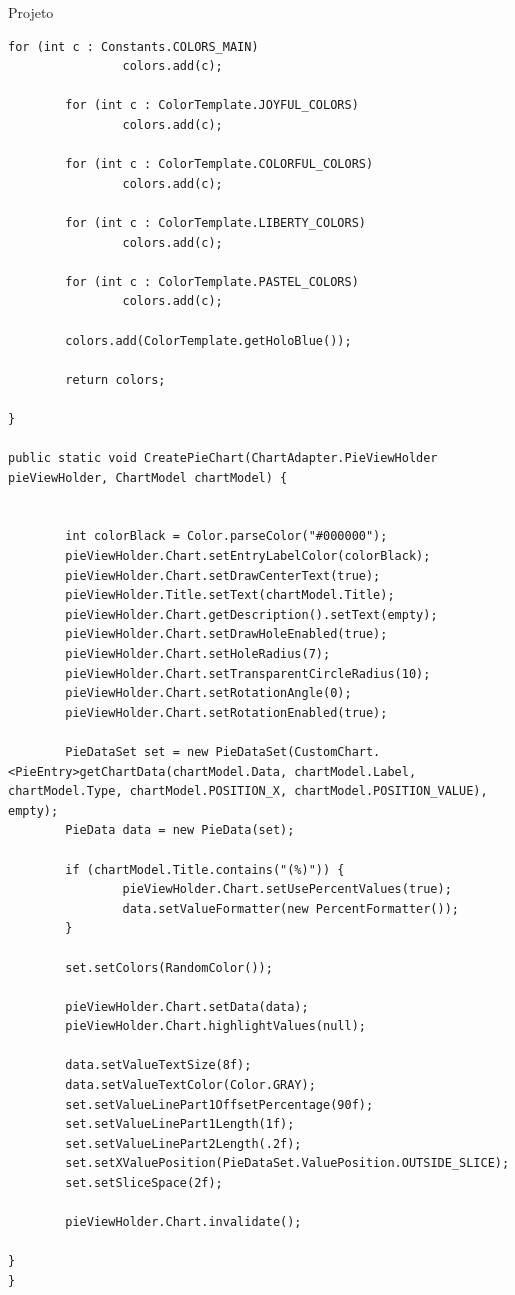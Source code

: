 \documentclass[
	12pt,				%
	openright,			%
	twoside,			%
	a4paper,			%
	english,			%
	french,				%
	spanish,			%
	brazil				%
	]{abntex2}
\begin{document}
\begin{chapter}{Projeto}
\begin{lstlisting}[numbers=none,basicstyle=\small,
caption={CustomChart.java},
title={CustomChart.java},
label={CustomChart.java}]
		for (int c : Constants.COLORS_MAIN)
				colors.add(c);

		for (int c : ColorTemplate.JOYFUL_COLORS)
				colors.add(c);

		for (int c : ColorTemplate.COLORFUL_COLORS)
				colors.add(c);

		for (int c : ColorTemplate.LIBERTY_COLORS)
				colors.add(c);

		for (int c : ColorTemplate.PASTEL_COLORS)
				colors.add(c);

		colors.add(ColorTemplate.getHoloBlue());

		return colors;

}

public static void CreatePieChart(ChartAdapter.PieViewHolder pieViewHolder, ChartModel chartModel) {


		int colorBlack = Color.parseColor("#000000");
		pieViewHolder.Chart.setEntryLabelColor(colorBlack);
		pieViewHolder.Chart.setDrawCenterText(true);
		pieViewHolder.Title.setText(chartModel.Title);
		pieViewHolder.Chart.getDescription().setText(empty);
		pieViewHolder.Chart.setDrawHoleEnabled(true);
		pieViewHolder.Chart.setHoleRadius(7);
		pieViewHolder.Chart.setTransparentCircleRadius(10);
		pieViewHolder.Chart.setRotationAngle(0);
		pieViewHolder.Chart.setRotationEnabled(true);

		PieDataSet set = new PieDataSet(CustomChart.<PieEntry>getChartData(chartModel.Data, chartModel.Label, chartModel.Type, chartModel.POSITION_X, chartModel.POSITION_VALUE), empty);
		PieData data = new PieData(set);

		if (chartModel.Title.contains("(%)")) {
				pieViewHolder.Chart.setUsePercentValues(true);
				data.setValueFormatter(new PercentFormatter());
		}

		set.setColors(RandomColor());

		pieViewHolder.Chart.setData(data);
		pieViewHolder.Chart.highlightValues(null);

		data.setValueTextSize(8f);
		data.setValueTextColor(Color.GRAY);
		set.setValueLinePart1OffsetPercentage(90f);
		set.setValueLinePart1Length(1f);
		set.setValueLinePart2Length(.2f);
		set.setXValuePosition(PieDataSet.ValuePosition.OUTSIDE_SLICE);
		set.setSliceSpace(2f);

		pieViewHolder.Chart.invalidate();

}
}
\end{lstlisting}

\begin{lstlisting}[numbers=none,basicstyle=\small,
caption={ChartAdapter.java},
title={ChartAdapter.java},
label={ChartAdapter.java}]


\end{lstlisting}
\end{chapter}
\end{document}
